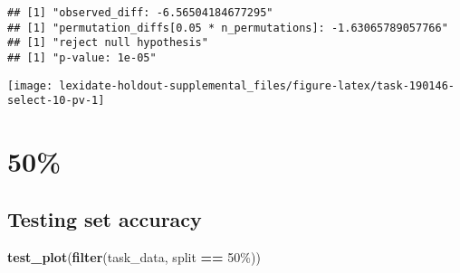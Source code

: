 \documentclass[
]{book}
\newenvironment{Shaded}{\begin{snugshade}}{\end{snugshade}}
\newcommand{\AttributeTok}[1]{\textcolor[rgb]{0.13,0.29,0.53}{#1}}
\newcommand{\DecValTok}[1]{\textcolor[rgb]{0.00,0.00,0.81}{#1}}
\newcommand{\FunctionTok}[1]{\textcolor[rgb]{0.13,0.29,0.53}{\textbf{#1}}}
\newcommand{\NormalTok}[1]{#1}
\newcommand{\OtherTok}[1]{\textcolor[rgb]{0.56,0.35,0.01}{#1}}
\newcommand{\SpecialCharTok}[1]{\textcolor[rgb]{0.81,0.36,0.00}{\textbf{#1}}}
\newcommand{\StringTok}[1]{\textcolor[rgb]{0.31,0.60,0.02}{#1}}
\begin{document}
\begin{Shaded}
\end{Shaded}

\begin{verbatim}
## [1] "observed_diff: -6.56504184677295"
## [1] "permutation_diffs[0.05 * n_permutations]: -1.63065789057766"
## [1] "reject null hypothesis"
## [1] "p-value: 1e-05"
\end{verbatim}

\texttt{[image: lexidate-holdout-supplemental\_files/figure-latex/task-190146-select-10-pv-1]}

\hypertarget{section-17}{%
\section{50\%}\label{section-17}}

\hypertarget{testing-set-accuracy-17}{%
\subsection{Testing set accuracy}\label{testing-set-accuracy-17}}

\begin{Shaded}
\begin{Highlighting}[]
\FunctionTok{test\_plot}\NormalTok{(}\FunctionTok{filter}\NormalTok{(task\_data, split }\SpecialCharTok{==} \StringTok{\textquotesingle{}50\%\textquotesingle{}}\NormalTok{))}
\end{Highlighting}
\end{Shaded}
\end{document}
